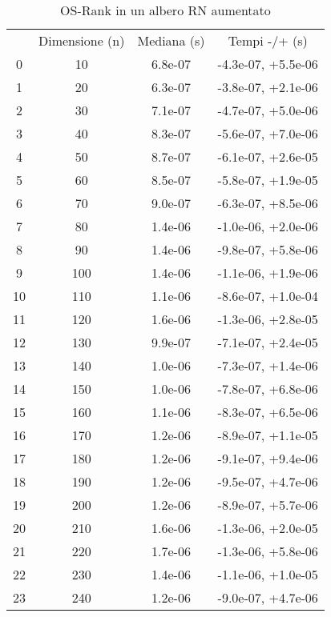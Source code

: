 \begin{table}
\centering
\caption{OS-Rank in un albero RN aumentato}
\label{OS-Rank in un albero RN aumentato}
\begin{adjustbox}{width=1\textwidth/2}
\begin{tabular}{|c|c|c|c|}
\hline
 & Dimensione (n) & Mediana (s) & Tempi -/+ (s) \\
0 & 10 & 6.8e-07 & -4.3e-07, +5.5e-06 \\
\cline{1-4}
1 & 20 & 6.3e-07 & -3.8e-07, +2.1e-06 \\
\cline{1-4}
2 & 30 & 7.1e-07 & -4.7e-07, +5.0e-06 \\
\cline{1-4}
3 & 40 & 8.3e-07 & -5.6e-07, +7.0e-06 \\
\cline{1-4}
4 & 50 & 8.7e-07 & -6.1e-07, +2.6e-05 \\
\cline{1-4}
5 & 60 & 8.5e-07 & -5.8e-07, +1.9e-05 \\
\cline{1-4}
6 & 70 & 9.0e-07 & -6.3e-07, +8.5e-06 \\
\cline{1-4}
7 & 80 & 1.4e-06 & -1.0e-06, +2.0e-06 \\
\cline{1-4}
8 & 90 & 1.4e-06 & -9.8e-07, +5.8e-06 \\
\cline{1-4}
9 & 100 & 1.4e-06 & -1.1e-06, +1.9e-06 \\
\cline{1-4}
10 & 110 & 1.1e-06 & -8.6e-07, +1.0e-04 \\
\cline{1-4}
11 & 120 & 1.6e-06 & -1.3e-06, +2.8e-05 \\
\cline{1-4}
12 & 130 & 9.9e-07 & -7.1e-07, +2.4e-05 \\
\cline{1-4}
13 & 140 & 1.0e-06 & -7.3e-07, +1.4e-06 \\
\cline{1-4}
14 & 150 & 1.0e-06 & -7.8e-07, +6.8e-06 \\
\cline{1-4}
15 & 160 & 1.1e-06 & -8.3e-07, +6.5e-06 \\
\cline{1-4}
16 & 170 & 1.2e-06 & -8.9e-07, +1.1e-05 \\
\cline{1-4}
17 & 180 & 1.2e-06 & -9.1e-07, +9.4e-06 \\
\cline{1-4}
18 & 190 & 1.2e-06 & -9.5e-07, +4.7e-06 \\
\cline{1-4}
19 & 200 & 1.2e-06 & -8.9e-07, +5.7e-06 \\
\cline{1-4}
20 & 210 & 1.6e-06 & -1.3e-06, +2.0e-05 \\
\cline{1-4}
21 & 220 & 1.7e-06 & -1.3e-06, +5.8e-06 \\
\cline{1-4}
22 & 230 & 1.4e-06 & -1.1e-06, +1.0e-05 \\
\cline{1-4}
23 & 240 & 1.2e-06 & -9.0e-07, +4.7e-06 \\

\end{tabular}
\end{adjustbox}
\end{table}
